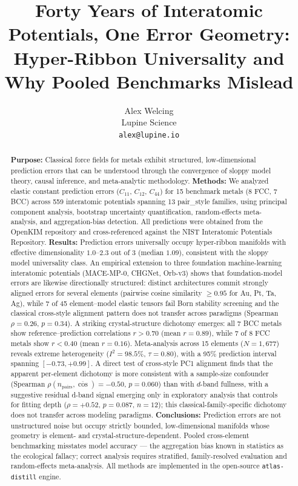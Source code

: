 \documentclass[twocolumn,10pt]{article}
\begin{document}
\title{\bfseries Forty Years of Interatomic Potentials, One Error Geometry: Hyper-Ribbon Universality and Why Pooled Benchmarks Mislead}
\author{Alex Welcing\\
\small Lupine Science\\
\small \texttt{alex@lupine.io}}
\date{}

\begin{abstract}
\noindent\textbf{Purpose:} Classical force fields for metals exhibit structured, low-dimensional prediction errors that can be understood through the convergence of sloppy model theory, causal inference, and meta-analytic methodology.
\textbf{Methods:} We analyzed elastic constant prediction errors ($C_{11}$, $C_{12}$, $C_{44}$) for 15 benchmark metals (8 FCC, 7 BCC) across 559 interatomic potentials spanning 13 pair\_style families, using principal component analysis, bootstrap uncertainty quantification, random-effects meta-analysis, and aggregation-bias detection. All predictions were obtained from the OpenKIM repository and cross-referenced against the NIST Interatomic Potentials Repository.
\textbf{Results:} Prediction errors universally occupy hyper-ribbon manifolds with effective dimensionality $1.0$--$2.3$ out of 3 (median $1.09$), consistent with the sloppy model universality class. An empirical extension to three foundation machine-learning interatomic potentials (MACE-MP-0, CHGNet, Orb-v3) shows that foundation-model errors are likewise directionally structured: distinct architectures commit strongly aligned errors for several elements (pairwise cosine similarity $\geq 0.95$ for Au, Pt, Ta, Ag), while 7 of 45 element--model elastic tensors fail Born stability screening and the classical cross-style alignment pattern does not transfer across paradigms (Spearman $\rho = 0.26$, $p = 0.34$). A striking crystal-structure dichotomy emerges: all 7 BCC metals show reference--prediction correlations $r>0.70$ (mean $r=0.89$), while 7 of 8 FCC metals show $r<0.40$ (mean $r=0.16$). Meta-analysis across 15 elements ($N=1{,}677$) reveals extreme heterogeneity ($I^2=98.5\%$, $\tau=0.80$), with a 95\% prediction interval spanning $[-0.73, +0.99]$. A direct test of cross-style PC1 alignment finds that the apparent per-element dichotomy is more consistent with a sample-size confounder (Spearman $\rho(n_{\text{pairs}}, \overline{\cos}) = -0.50$, $p = 0.060$) than with $d$-band fullness, with a suggestive residual d-band signal emerging only in exploratory analysis that controls for fitting depth ($\rho = +0.52$, $p = 0.087$, $n=12$); this classical-family-specific dichotomy does not transfer across modeling paradigms.
\textbf{Conclusions:} Prediction errors are not unstructured noise but occupy strictly bounded, low-dimensional manifolds whose geometry is element- and crystal-structure-dependent. Pooled cross-element benchmarking misstates model accuracy --- the aggregation bias known in statistics as the ecological fallacy; correct analysis requires stratified, family-resolved evaluation and random-effects meta-analysis. All methods are implemented in the open-source \texttt{atlas-distill} engine.
\end{abstract}
\end{document}
